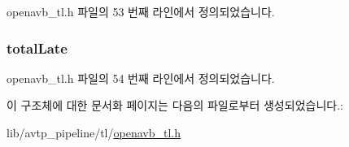 openavb\+\_\+tl.\+h 파일의 53 번째 라인에서 정의되었습니다.

\subsubsection[{\texorpdfstring{total\+Late}{totalLate}}]{ total\+Late}\hypertarget{structtalker__stats__t_aba3967ed25ae307754c6341e9e3e51b7}{}\label{structtalker__stats__t_aba3967ed25ae307754c6341e9e3e51b7}


openavb\+\_\+tl.\+h 파일의 54 번째 라인에서 정의되었습니다.



이 구조체에 대한 문서화 페이지는 다음의 파일로부터 생성되었습니다.\+:\begin{DoxyCompactItemize}
\item 
lib/avtp\+\_\+pipeline/tl/\hyperlink{openavb__tl_8h}{openavb\+\_\+tl.\+h}\end{DoxyCompactItemize}
